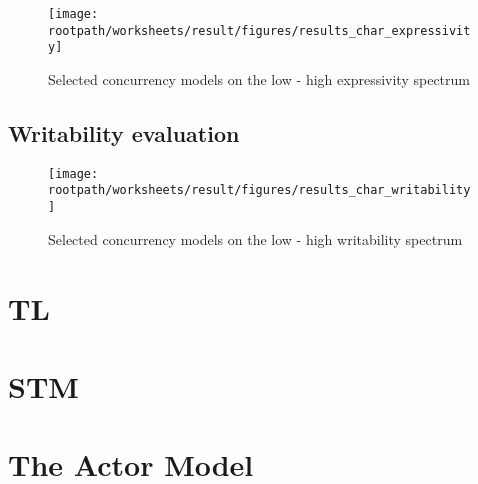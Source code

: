 \begin{figure}[htbp]
\centering
 \texttt{[image: \\rootpath/worksheets/result/figures/results\_char\_expressivity]} 
 \caption{Selected concurrency models on the low - high expressivity spectrum}
\label{fig:results_char_expressivity}
\end{figure}

\subsection{Writability evaluation}

\begin{figure}[htbp]
\centering
 \texttt{[image: \\rootpath/worksheets/result/figures/results\_char\_writability]} 
 \caption{Selected concurrency models on the low - high writability spectrum}
\label{fig:results_char_writability}
\end{figure}

\section{\acl{TL}}
\section{\acl{STM}}
\section{The Actor Model}
\worksheetend
